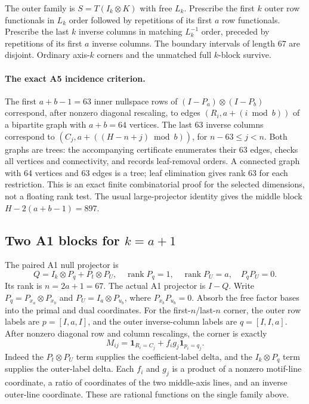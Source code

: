 The outer family is $S=T(I_k\otimes K)$ with free $L_k$. Prescribe the
first $k$ outer row functionals in $L_k$ order followed by repetitions of
its first $a$ row functionals. Prescribe the last $k$ inverse columns in
matching $L_k^{-1}$ order, preceded by repetitions of its first $a$
inverse columns. The boundary intervals of length $67$ are disjoint.
Ordinary axis-$k$ corners and the unmatched full $k$-block survive.

\paragraph{The exact A5 incidence criterion.}
The first $a+b-1=63$ inner nullspace rows of
$(I-P_a)\otimes(I-P_b)$ correspond, after nonzero diagonal rescaling,
to edges $(R_i,a+(i\bmod b))$ of a bipartite graph with $a+b=64$
vertices. The last 63 inverse columns correspond to
$(C_j,a+((H-n+j)\bmod b))$, for $n-63\le j<n$.
Both graphs are trees: the accompanying certificate enumerates their
63 edges, checks all vertices and connectivity, and records leaf-removal
orders. A connected graph with 64 vertices and 63 edges is a tree;
leaf elimination gives rank 63 for each restriction. This is an exact
finite combinatorial proof for the selected dimensions, not a floating
rank test. The usual large-projector identity gives the middle block
$H-2(a+b-1)=897$.

\subsection{Two A1 blocks for $k=a+1$}
The paired A1 null projector is
\[
 Q=I_k\otimes P_q+P_t\otimes P_U,\quad
 \operatorname{rank}P_q=1,\quad\operatorname{rank}P_U=a,\quad P_qP_U=0.
\]
Its rank is $n=2a+1=67$. The actual A1 projector is $I-Q$.
Write $P_q=P_{x_a}\otimes P_{x_b}$ and
$P_U=I_a\otimes P_{u_b}$, where $P_{x_b}P_{u_b}=0$.
Absorb the free factor bases into the primal and dual coordinates.
For the first-$n$/last-$n$ corner, the outer row labels are
$p=[I,a,I]$, and the outer inverse-column labels are $q=[I,I,a]$.
After nonzero diagonal row and column rescalings, the corner is exactly
\[
 M_{ij}=\mathbf1_{R_i=C_j}+f_i g_j\mathbf1_{p_i=q_j}.
 \tag{A1}
\]
Indeed the $P_t\otimes P_U$ term supplies the coefficient-label delta,
and the $I_k\otimes P_q$ term supplies the outer-label delta. Each $f_i$
and $g_j$ is a product of a nonzero motif-line coordinate, a ratio of
coordinates of the two middle-axis lines, and an inverse outer-line
coordinate. These are rational functions on the single family above.

